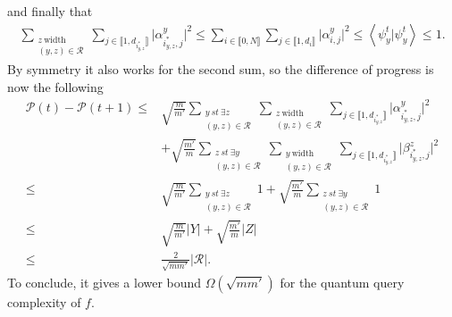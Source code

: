 \begin{appendix}
\begin{tproof}
        and finally that
        \begin{align*}
            \sum_{\substack{z\ \textrm{width} \\ (y,z) \in \mathcal{R}}}
            \sum_{j\in\llbracket1,d_{i^*_{y,z}}\rrbracket}\vert\alpha^{y}_{i^*_{y,z},j}\vert^2
            \leq \sum_{i \in \llbracket0,N\rrbracket}
            \sum_{j\in\llbracket1,d_{i}\rrbracket}\vert\alpha^{y}_{i,j}\vert^2 \leq \left\langle \psi_y^t \vert \psi_y^t \right\rangle \leq 1.
        \end{align*}
        By symmetry it also works for the second sum, so the difference of progress is now the following
        \begin{align*}
            \mathcal{P}(t)- \mathcal{P}(t+1)  \leq & \sqrt{\frac{m}{m'}}
            \sum_{\substack{y\ st\ \exists z                                                                               \\ (y,z) \in \mathcal{R}}}
            \sum_{\substack{z\ \textrm{width}                                                                              \\ (y,z) \in \mathcal{R}}}
            \sum_{j\in\llbracket1,d_{i^*_{y,z}}\rrbracket}\vert\alpha^{y}_{i^*_{y,z},j}\vert^2                             \\
                                                   & +\sqrt{\frac{m'}{m}} \sum_{\substack{z\ st\ \exists y                 \\ (y,z) \in \mathcal{R}}}
            \sum_{\substack{y\ \textrm{width}                                                                              \\ (y,z) \in \mathcal{R}}}
            \sum_{j\in\llbracket1,d_{i^*_{y,z}}\rrbracket}\vert\beta^{z}_{i^*_{y,z},j}\vert^2                              \\
            \leq                                   & \sqrt{\frac{m}{m'}} \sum_{\substack{y\ st\ \exists z                  \\ (y,z) \in \mathcal{R}}} 1 + \sqrt{\frac{m'}{m}} \sum_{\substack{z\ st\ \exists y \\ (y,z) \in \mathcal{R}}} 1 \\
            \leq                                   & \sqrt{\frac{m}{m'}} \vert Y \vert + \sqrt{\frac{m'}{m}} \vert Z \vert \\
            \leq                                   & \frac{2}{\sqrt{mm'}}\vert \mathcal{R} \vert.
        \end{align*}
        To conclude, it gives a lower bound $\Omega(\sqrt{mm'})$ for the quantum query complexity of $f$.


\end{tproof}
\end{appendix}

